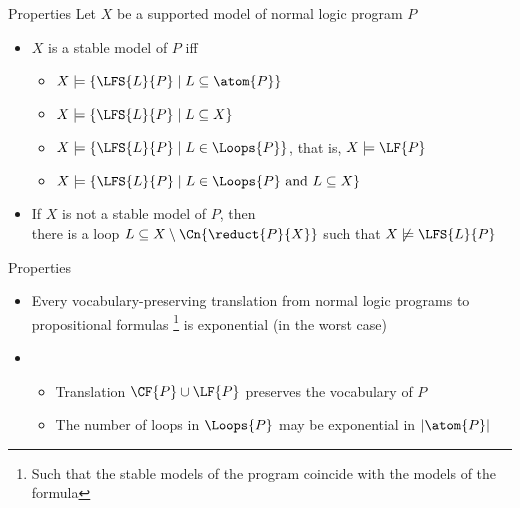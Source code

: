\begin{frame}{Properties}
  \bigskip
  Let $X$ be a supported model of normal logic program $P$
  \medskip
  \begin{itemize}
  \item<2-> $X$ is a stable model of $P$ iff
    \smallskip
    \begin{itemize}\normalsize
    \item $X\models\{  \LFS{L}{P} \mid L\subseteq\atom{P}  \}$
    \item $X\models\{  \LFS{L}{P} \mid L\subseteq X  \}$
    \item $X\models\{  \LFS{L}{P} \mid L\in\Loops{P}  \}$, that is, $X\models\LF{P}$
    \item $X\models\{  \LFS{L}{P} \mid L\in\Loops{P}\text{ and } L\subseteq X  \}$
    \end{itemize}
    \medskip
  \item<3-> If $X$ is not a stable model of $P$, then\\
    there is a loop $L \subseteq X \setminus \Cn{\reduct{P}{X}}$ such that $X \not\models \LFS{L}{P}$
  \end{itemize}
\end{frame}
\begin{frame}{Properties}
  \bigskip
  \begin{itemize}
  \item<1-> Every vocabulary-preserving translation from normal logic programs to
    propositional formulas%
    \footnote{Such that the stable models of the program coincide with the models of the formula}
    is exponential (in the worst case)
    \medskip
  \item<2-> \
    \begin{itemize}\normalsize
    \item Translation $\CF{P}\cup\LF{P}$ preserves the vocabulary of $P$
      \smallskip
    \item The number of loops in $\Loops{P}$ may be exponential in $|\atom{P}|$
    \end{itemize}
  \end{itemize}
\end{frame}
